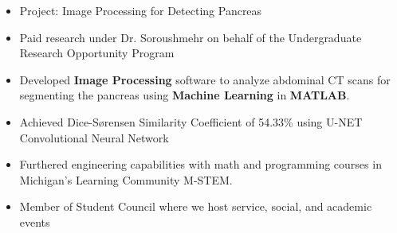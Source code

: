 \documentclass[10pt,a4paper,ragged2e]{altacv}
\begin{document}
\divider

\begin{itemize}
\item Project: Image Processing for Detecting Pancreas 
\smallskip
\item Paid research under Dr. Soroushmehr on behalf of the Undergraduate Research Opportunity Program
\smallskip
\item Developed \textbf{Image Processing} software to analyze abdominal CT scans for segmenting the pancreas using \textbf{Machine Learning} in \textbf{MATLAB}.
\smallskip
\item Achieved Dice-Sørensen Similarity Coefficient of 54.33\% using U-NET Convolutional Neural Network
\end{itemize}

\divider

\begin{itemize}
\item Furthered engineering capabilities with math and programming courses in Michigan's Learning Community M-STEM.
\smallskip
\item Member of Student Council where we host service, social, and academic events
\end{itemize}

\clearpage

\nocite{*}
\end{document}
